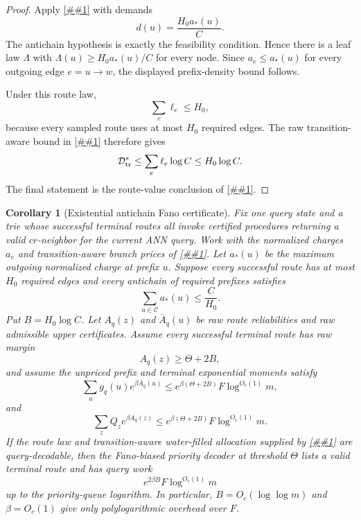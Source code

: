 \documentclass[10pt]{article}
\newcommand{\cref}[1]{\ref{##1}}
\newtheorem{corollary}[theorem]{Corollary}
\theoremstyle{definition}
\begin{document}
\begin{proof}
   Apply \cref{lem:antichain-prefix-density-flow} with demands
   \[
      d(u)=\frac{H_0a_*(u)}{C}.
   \]
   The antichain hypothesis is exactly the feasibility condition.  Hence there
   is a leaf law \(\Lambda\) with \(\Lambda(u)\ge H_0a_*(u)/C\) for every
   node.  Since \(a_e\le a_*(u)\) for every outgoing edge \(e=u\to w\), the
   displayed prefix-density bound follows.

   Under this route law,
   \[
      \sum_e\ell_e\le H_0,
   \]
   because every sampled route uses at most \(H_0\) required edges.  The raw
   transition-aware bound in \cref{cor:transition-waterfilled-allocation}
   therefore gives
   \[
      \mathcal D^*_{\rm tr}
      \le
      \sum_e\ell_e\log C
      \le H_0\log C.
   \]
   The final statement is the route-value conclusion of
   \cref{cor:transition-waterfilled-allocation}.
\end{proof}

\begin{corollary}[Existential antichain Fano certificate]
   \label{cor:existential-antichain-fano}
   Fix one query state and a trie whose successful terminal routes all invoke
   certified procedures returning a valid \(cr\)-neighbor for the current ANN
   query.  Work with the normalized charges \(a_e\) and transition-aware
   branch prices of \cref{cor:transition-waterfilled-allocation}.  Let
   \(a_*(u)\) be the maximum outgoing normalized charge at prefix \(u\).  Suppose
   every successful route has at most \(H_0\) required edges and every antichain
   of required prefixes satisfies
   \[
      \sum_{u\in\mathcal C}a_*(u)\le \frac{C}{H_0}.
   \]
   Put \(B=H_0\log C\).  Let \(A_q(z)\) and \(\overline A_q(u)\) be raw
   route reliabilities and raw admissible upper certificates.  Assume every
   successful terminal route has raw margin
   \[
      A_q(z)\ge \Theta+2B,
   \]
   and assume the unpriced prefix and terminal exponential moments satisfy
   \[
      \sum_u g_q(u)e^{\beta\overline A_q(u)}
      \le
      e^{\beta(\Theta+2B)}F\log^{O_c(1)}m,
   \]
   and
   \[
      \sum_z Q_z e^{\beta A_q(z)}
      \le
      e^{\beta(\Theta+2B)}F\log^{O_c(1)}m.
   \]
   If the route law and transition-aware water-filled allocation supplied by
   \cref{cor:antichain-transition-waterfill} are query-decodable, then the
   Fano-biased priority decoder at threshold \(\Theta\) lists a valid terminal
   route and has query work
   \[
      e^{2\beta B}F\log^{O_c(1)}m
   \]
   up to the priority-queue logarithm.  In particular,
   \(B=O_c(\log\log m)\) and \(\beta=O_c(1)\) give only polylogarithmic
   overhead over \(F\).
\end{corollary}
\end{document}
